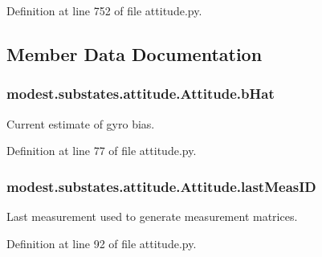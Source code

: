Definition at line 752 of file attitude.\+py.



\subsection{Member Data Documentation}
\subsubsection[{\texorpdfstring{b\+Hat}{bHat}}]{\setlength{\rightskip}{0pt plus 5cm}modest.\+substates.\+attitude.\+Attitude.\+b\+Hat}\hypertarget{classmodest_1_1substates_1_1attitude_1_1Attitude_aac0bc92dc53893d2f190c1252690053c}{}\label{classmodest_1_1substates_1_1attitude_1_1Attitude_aac0bc92dc53893d2f190c1252690053c}


Current estimate of gyro bias. 



Definition at line 77 of file attitude.\+py.

\subsubsection[{\texorpdfstring{last\+Meas\+ID}{lastMeasID}}]{\setlength{\rightskip}{0pt plus 5cm}modest.\+substates.\+attitude.\+Attitude.\+last\+Meas\+ID}\hypertarget{classmodest_1_1substates_1_1attitude_1_1Attitude_abc1a273c6fd65c839184ae644b68f010}{}\label{classmodest_1_1substates_1_1attitude_1_1Attitude_abc1a273c6fd65c839184ae644b68f010}


Last measurement used to generate measurement matrices. 



Definition at line 92 of file attitude.\+py.

